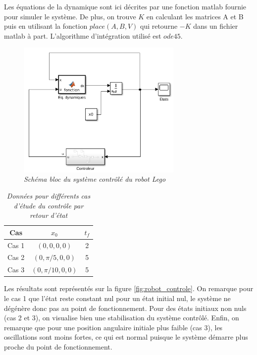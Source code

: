 \documentclass[11pt,french]{article} %
\begin{document}
\quad Les équations de la dynamique sont ici décrites par une fonction matlab fournie pour simuler le système. De plus, on trouve $K$ en calculant les matrices A et B puis en utilisant la fonction $place(A,B,V)$ qui retourne $-K$ dans un fichier matlab à part. L'algorithme d'intégration utilisé est $ode45$. \\

\begin{figure}[H]
    \centering
    \includegraphics[width=8cm]{simulink_tp3_1.png} 
		\caption{\textit{Schéma bloc du système contrôlé du robot Lego}}
		\label{fig:simulink_tp3_1}
\end{figure}
\vspace{0.5cm}

\begin{table}[h!]
\centering
\begin{tabular}{|c c c|} 
 \hline
 Cas & $x_0$ & $t_f$ \\ [0.5ex] 
 \hline\hline
 Cas 1 & $(0,0,0,0)$ & 2 \\ 
 Cas 2 & $(0,\pi/5,0,0)$ & 5 \\ 
 Cas 3 & $(0,\pi/10,0,0)$ & 5 \\ [1ex] 
 \hline
\end{tabular}
\caption{\textit{Données pour différents cas d'étude du contrôle par retour d'état}}
\label{table:3}
\end{table}

\quad Les résultats sont représentés sur la figure \ref{fig:robot_controle}. On remarque pour le cas 1 que l'état reste constant nul pour un état initial nul, le système ne dégénère donc pas au point de fonctionnement. Pour des états initiaux non nuls (cas 2 et 3), on visualise bien une stabilisation du système contrôlé. Enfin, on remarque que pour une position angulaire initiale plus faible (cas 3), les oscillations sont moins fortes, ce qui est normal puisque le système démarre plus proche du point de fonctionnement. \\ 
\end{document}

